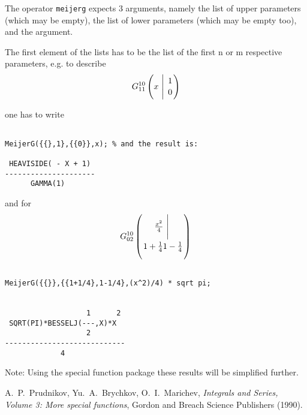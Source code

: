 The operator {\tt meijerg} expects 3 arguments, namely the 
list of upper parameters (which may be empty), the list of lower
parameters (which may be empty too), and the argument.

The first element of the lists has to be the list of the
first n or m respective parameters, e.g. to describe 
\begin{displaymath}
G_{1 1}^{1 0} \left( x \  \Bigg\vert \  {1 \atop 0} \right)
\end{displaymath}

one has to write 
\begin{verbatim}

MeijerG({{},1},{{0}},x); % and the result is:

 HEAVISIDE( - X + 1)
---------------------
      GAMMA(1)

\end{verbatim}
and for
\begin{displaymath}
G_{0 2}^{1 0} \left( \frac{x^2}{4} \  \Bigg\vert \ {} \atop  {1+ \frac{1}{4} }
{1-\frac{1}{4}} \right)
\end{displaymath}
\begin{verbatim}

MeijerG({{}},{{1+1/4},1-1/4},(x^2)/4) * sqrt pi;


                   1      2
 SQRT(PI)*BESSELJ(---,X)*X
                   2
----------------------------
             4

\end{verbatim}

Note: Using the special function package these results will be
simplified further.

\begin{thebibliography}{9}

 A.~P.~Prudnikov, Yu.~A.~Brychkov, O.~I.~Marichev,
{\em Integrals and Series, Volume 3: More special functions},
Gordon and Breach Science Publishers (1990).

\end{thebibliography}

